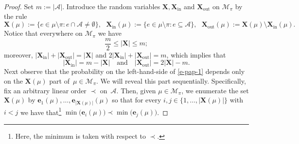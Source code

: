 \documentclass[11pt,leqno]{amsart}
\theoremstyle{remark}
\theoremstyle{plain}
\begin{document}
\begin{proof}
Set $m:=|\mathcal{A}|$. Introduce the random variables $\mathbf{X}, \mathbf{X}_{\mathrm{in}}$
and $\mathbf{X}_{\mathrm{out}}$ on $\mathcal{M}_{\pi}$ by the rule
\[ \mathbf{X}(\mu) := \big\{ e\in\mu\setminus\pi\colon e\cap \mathcal{A}\neq\emptyset \big\}, \ \ \
\mathbf{X}_{\mathrm{in}}(\mu):=  \big\{ e\in\mu\setminus \pi\colon e \subseteq \mathcal{A}\big\},
\ \ \ \mathbf{X}_{\mathrm{out}}(\mu) := \mathbf{X}(\mu) \setminus \mathbf{X}_{\mathrm{in}}(\mu). \]
Notice that everywhere on $\mathcal{M}_\pi$ we have
\[ \frac{m}{2}\leqslant |\mathbf{X}| \leqslant m; \]
moreover, $|\mathbf{X}_{\mathrm{in}}|+|\mathbf{X}_{\mathrm{out}}|=|\mathbf{X}|$
and $2 |\mathbf{X}_{\mathrm{in}}|+ |\mathbf{X}_{\mathrm{out}}|= m$, which implies that
\begin{equation} \label{eqkt19}
|\mathbf{X}_{\mathrm{in}}|= m- |\mathbf{X}| \ \ \ \text{ and } \ \ \
|\mathbf{X}_{\mathrm{out}}| = 2|\mathbf{X}| - m.
\end{equation}
Next observe that the probability on the left-hand-side of \eqref{e-pap-1} depends only on the $\mathbf{X}(\mu)$ part
of~$\mu\in\mathcal{M}_\pi$. We will reveal this part sequentially. Specifically, fix an arbitrary linear order $\prec$
on~$\mathcal{A}$. Then, given $\mu\in\mathcal{M}_{\pi}$, we enumerate the set $\mathbf{X}(\mu)$ by
$\mathbf{e}_1(\mu),\dots,\mathbf{e}_{|\mathbf{X}(\mu)|}(\mu)$ so that for every $i,j\in \big\{1,\dots, |\mathbf{X}(\mu)|\big\}$
with $i<j$ we have that\footnote{Here, the minimum is taken with respect to $\prec$.}
$\min\big(\mathbf{e}_i(\mu)\big) \prec \min\big(\mathbf{e}_j(\mu)\big)$.


\end{proof}
\end{document}
